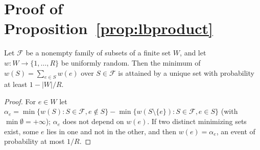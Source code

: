 \section{Proof of Proposition~\ref{prop:lbproduct}}\label{app:lbproduct}
\begin{lemma}\label{lem:isolation}
Let $\mathcal F$ be a nonempty family of subsets of a finite set $W$, and let
$w:W\to\{1,\dots,R\}$ be uniformly random. Then the minimum of
$w(S)=\sum_{e\in S}w(e)$ over $S\in\mathcal F$ is attained by a unique set with
probability at least $1-|W|/R$.
\end{lemma}

\begin{proof}
For $e\in W$ let $\alpha_e=\min\{w(S):S\in\mathcal F,e\notin S\}
-\min\{w(S\setminus\{e\}):S\in\mathcal F,e\in S\}$ (with
$\min\emptyset=+\infty$); $\alpha_e$ does not depend on $w(e)$. If two
distinct minimizing sets exist, some $e$ lies in one and not in the other,
and then $w(e)=\alpha_e$, an event of probability at most $1/R$.
\end{proof}


